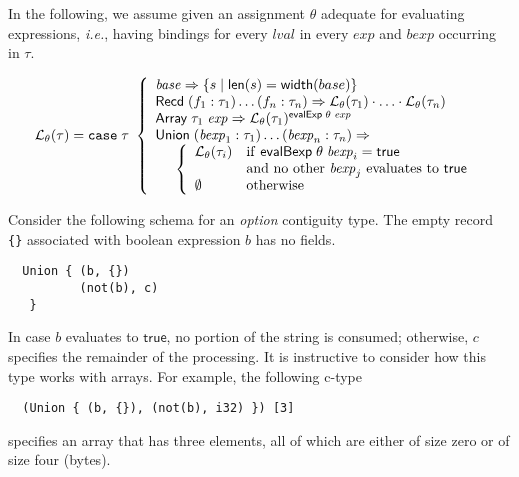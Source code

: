 \documentclass[svgnames]{llncs}
\newcommand{\ie}{\textit{i.e.}}
\newcommand{\konst}[1]{\ensuremath{\mathsf{#1}}}
\newcommand{\set}[1]{\ensuremath{\{ {#1} \}}}
\newcommand{\LangTheta}[1]{\ensuremath{{\mathcal L}_{\theta}({#1})}}
\begin{document}
\begin{definition}

 In the following, we assume given an assignment $\theta$ adequate for
evaluating expressions, \ie, having bindings for every
$\mathit{lval}$ in every $\mathit{exp}$ and $\mathit{bexp}$
occurring in $\tau$.

\[
\LangTheta{\tau} =
\mathtt{case}\; \tau\
 \left\{
 \begin{array}{l}
 \mathit{base} \Rightarrow \set{s \mid \konst{len}(s) = \konst{width}(base)} \\
 \konst{Recd}\; (f_1 : \tau_1) \ldots (f_n : \tau_n)
      \Rightarrow \LangTheta{\tau_1} \cdot \ldots \cdot \LangTheta{\tau_n}
\\
 \konst{Array}\; \tau_1 \; \mathit{exp}
      \Rightarrow  \LangTheta{\tau_1}^{\konst{evalExp}\;\theta\;\mathit{exp}}
\\
 \konst{Union}\; (\mathit{bexp}_1 : \tau_1) \ldots (\mathit{bexp}_n : \tau_n) \Rightarrow \\
  \hspace*{5mm}
 \left\{
 \begin{array}{ll}
    \LangTheta{\tau_i} &  \mathrm{if}\ \konst{evalBexp}\;\theta\;\mathit{bexp}_i = \konst{true} \\
                  & \mathrm{and\ no\ other}\ \mathit{bexp}_j\ \mathrm{evaluates\ to}\ \konst{true}  \\
    \emptyset & \mathrm{otherwise}
 \end{array}
 \right.
 \\
\end{array}
 \right.
\]
\end{definition}

\begin{example}
Consider the following schema for an \emph{option} contiguity
type. The empty record \verb+{}+ associated with boolean expression
$b$ has no fields.

\begin{verbatim}
  Union { (b, {})
          (not(b), c)
   }
\end{verbatim}

\noindent In case $\mathit{b}$ evaluates to \konst{true}, no portion of the
string is consumed; otherwise, $c$ specifies the remainder of the
processing. It is instructive to consider how this type works with
arrays. For example, the following c-type

\begin{verbatim}
  (Union { (b, {}), (not(b), i32) }) [3]
\end{verbatim}

\noindent specifies an array that has three elements, all of which are either of
size zero or of size four (bytes).

\end{example}
\end{document}
